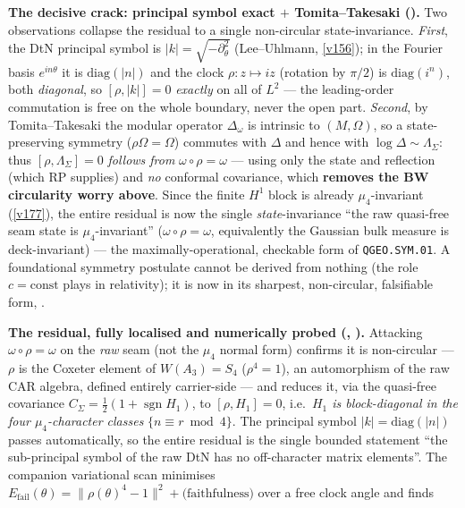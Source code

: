 \par\smallskip\noindent\textbf{The decisive crack: principal symbol exact $+$ Tomita--Takesaki
().} Two observations collapse the residual to a single
non-circular state-invariance. \emph{First}, the DtN principal symbol is $|k|=\sqrt{-\partial_\theta^2}$
(Lee--Uhlmann, \vref{v156}); in the Fourier basis $e^{in\theta}$ it is $\mathrm{diag}(|n|)$ and the clock
$\rho:z\mapsto iz$ (rotation by $\pi/2$) is $\mathrm{diag}(i^n)$, both \emph{diagonal}, so
$[\rho,|k|]=0$ \emph{exactly} on all of $L^2$ --- the leading-order commutation is free on the whole
boundary, never the open part. \emph{Second}, by Tomita--Takesaki the modular operator $\Delta_\omega$ is
intrinsic to $(M,\Omega)$, so a state-preserving symmetry ($\rho\Omega=\Omega$) commutes with $\Delta$ and
hence with $\log\Delta\sim\Lambda_\Sigma$: thus $[\rho,\Lambda_\Sigma]=0$ \emph{follows from}
$\omega\circ\rho=\omega$ --- using only the state and reflection (which RP supplies) and \emph{no} conformal
covariance, which \textbf{removes the BW circularity worry above}. Since the finite $H^1$ block is already
$\mu_4$-invariant (\vref{v177}), the entire residual is now the single \emph{state}-invariance ``the raw
quasi-free seam state is $\mu_4$-invariant'' ($\omega\circ\rho=\omega$, equivalently the Gaussian bulk
measure is deck-invariant) --- the maximally-operational, checkable form of \texttt{QGEO.SYM.01}. A
foundational symmetry postulate cannot be derived from nothing (the role $c=\text{const}$ plays in
relativity); it is now in its sharpest, non-circular, falsifiable form, \mO.
\par\smallskip\noindent\textbf{The residual, fully localised and numerically probed
(, ).} Attacking
$\omega\circ\rho=\omega$ on the \emph{raw} seam (not the $\mu_4$ normal form) confirms it is non-circular
--- $\rho$ is the Coxeter element of $W(A_3)=S_4$ ($\rho^4=1$), an automorphism of the raw CAR algebra,
defined entirely carrier-side --- and reduces it, via the quasi-free covariance
$C_\Sigma=\tfrac12(1+\operatorname{sgn}H_1)$, to $[\rho,H_1]=0$, i.e.\ \emph{$H_1$ is block-diagonal in the
four $\mu_4$-character classes} $\{n\equiv r\bmod4\}$. The principal symbol $|k|=\mathrm{diag}(|n|)$ passes
automatically, so the entire residual is the single bounded statement ``the sub-principal symbol of the raw
DtN has no off-character matrix elements''. The companion variational scan minimises
$E_{\mathrm{fail}}(\theta)=\|\rho(\theta)^4-1\|^2+\text{(faithfulness)}$ over a free clock angle and finds
